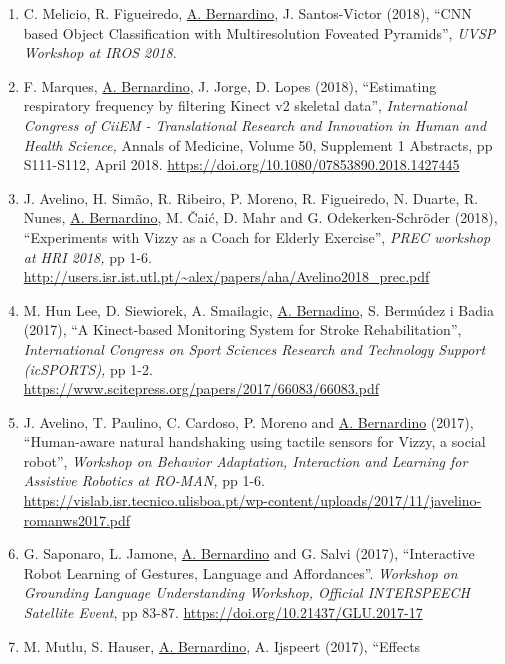 \begin{enumerate}
  R. Zenha, P. Vicente, L. Jamone and \ul{A. Bernardino} (2018), ``Robot
  body model self calibration through contact events'', \emph{Bodis
  Workshop at IROS 2018,} 4 pages.
  \url{https://webarchiv.typo3.tum.de/EI/ps/fileadmin/w00bcw/www/selfception/files/bodis2018/zenha_bodis-iros18ws_FINAL.pdf}~
\item
  C. Melicio, R. Figueiredo, \ul{A. Bernardino}, J. Santos-Victor
  (2018), ``CNN based Object Classification with Multiresolution
  Foveated Pyramids'', \emph{UVSP Workshop at IROS 2018}.
\item
  F. Marques, \ul{A. Bernardino}, J. Jorge, D. Lopes (2018),
  ``Estimating respiratory frequency by filtering Kinect v2 skeletal
  data'', \emph{International Congress of CiiEM - Translational Research
  and Innovation in Human and Health Science,} Annals of Medicine,
  Volume 50, Supplement 1 Abstracts, pp S111-S112, April 2018.
  \url{https://doi.org/10.1080/07853890.2018.1427445}~
\item
  J. Avelino, H. Simão, R. Ribeiro, P. Moreno, R. Figueiredo, N. Duarte,
  R. Nunes, \ul{A. Bernardino}, M. Čaić, D. Mahr and G.
  Odekerken-Schröder (2018), ``Experiments with Vizzy as a Coach for
  Elderly Exercise'', \emph{PREC workshop at HRI 2018,} pp 1-6.
  \url{http://users.isr.ist.utl.pt/~alex/papers/aha/Avelino2018_prec.pdf}
\item
  M. Hun Lee, D. Siewiorek, A. Smailagic, \ul{A. Bernadino}, S. Bermúdez
  i Badia (2017), ``A Kinect-based Monitoring System for Stroke
  Rehabilitation'', \emph{International Congress on Sport Sciences
  Research and Technology Support (icSPORTS),} pp 1-2.
  \url{https://www.scitepress.org/papers/2017/66083/66083.pdf}~
\item
  J. Avelino, T. Paulino, C. Cardoso, P. Moreno and \ul{A. Bernardino}
  (2017), ``Human-aware natural handshaking using tactile sensors for
  Vizzy, a social robot'', \emph{Workshop on Behavior Adaptation,
  Interaction and Learning for Assistive Robotics at RO-MAN,} pp 1-6.
  \url{https://vislab.isr.tecnico.ulisboa.pt/wp-content/uploads/2017/11/javelino-romanws2017.pdf}~
\item
  G. Saponaro, L. Jamone, \ul{A. Bernardino} and G. Salvi (2017),
  ``Interactive Robot Learning of Gestures, Language and Affordances''.
  \emph{Workshop on Grounding Language Understanding Workshop, Official
  INTERSPEECH Satellite Event}, pp 83-87.
  \url{https://doi.org/10.21437/GLU.2017-17}~
\item
  M. Mutlu, S. Hauser, \ul{A. Bernardino}, A. Ijspeert (2017), ``Effects

\end{enumerate}
